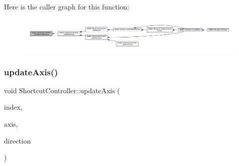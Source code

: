 Here is the caller graph for this function\+:
\nopagebreak
\begin{figure}[H]
\begin{center}
\leavevmode
\includegraphics[width=350pt]{class_q_g_b_a_1_1_shortcut_controller_ab8daaf3e0879b0fd47e64b666a86a7e1_icgraph}
\end{center}
\end{figure}
\mbox{\label{class_q_g_b_a_1_1_shortcut_controller_acb5c4ceb4c05eb8a2352d386250a6ab3}} 
\subsubsection{\texorpdfstring{update\+Axis()}{updateAxis()}}
{\footnotesize\ttfamily void Shortcut\+Controller\+::update\+Axis (\begin{DoxyParamCaption}\item[{const Q\+Model\+Index \&}]{index,  }\item[{\mbox{\hyperlink{ioapi_8h_a787fa3cf048117ba7123753c1e74fcd6}{int}}}]{axis,  }\item[{\mbox{\hyperlink{class_q_g_b_a_1_1_gamepad_axis_event_a5d50ab74dce4e58252f2affb5f227bbc}{Gamepad\+Axis\+Event\+::\+Direction}}}]{direction }\end{DoxyParamCaption})}

